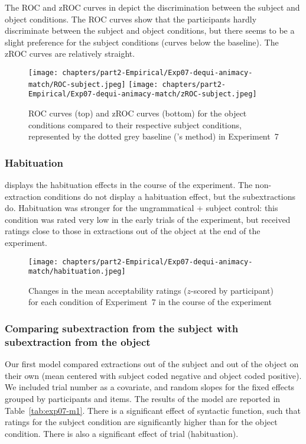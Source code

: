 The ROC and zROC curves in  depict the discrimination between the subject and object conditions. The ROC curves show that the participants hardly discriminate between the subject and object conditions, but there seems to be a slight preference for the subject conditions (curves below the baseline). The zROC curves are relatively straight.

\vfill
\begin{figure}[H]
    \centering
    \texttt{[image: chapters/part2-Empirical/Exp07-dequi-animacy-match/ROC-subject.jpeg]}
    \texttt{[image: chapters/part2-Empirical/Exp07-dequi-animacy-match/zROC-subject.jpeg]}
    \caption{ROC curves (top) and zROC curves (bottom) for the object conditions compared to their respective subject conditions, represented by the dotted grey baseline (\citealt{Dillon.2019}'s method) in Experiment~7}
    \label{fig:exp07-ROC-subj}
\end{figure}
\vfill
\pagebreak

\subsubsection{Habituation} 

 displays the habituation effects in the course of the experiment. The non-extraction conditions do not display a habituation effect, but the subextractions do. Habituation was stronger for the ungrammatical + subject control: this condition was rated very low in the early trials of the experiment, but received ratings close to those in extractions out of the object at the end of the experiment. 

\begin{figure}
    \centering
    \texttt{[image: chapters/part2-Empirical/Exp07-dequi-animacy-match/habituation.jpeg]}
    \caption{Changes in the mean acceptability ratings ($z$-scored by participant) for each condition of Experiment~7 in the course of the experiment}
    \label{fig:exp07-habituation}
\end{figure}

\subsubsection{Comparing subextraction from the subject with subextraction from the object}

Our first model compared extractions out of the subject and out of the object on their own (mean centered with subject coded negative and object coded positive). We included trial number as a covariate, and random slopes for the fixed effects grouped by participants and items. The results of the model are reported in Table~\ref{tab:exp07-m1}. There is a significant effect of syntactic function, such that ratings for the subject condition are significantly higher than for the object condition. There is also a significant effect of trial (habituation).

